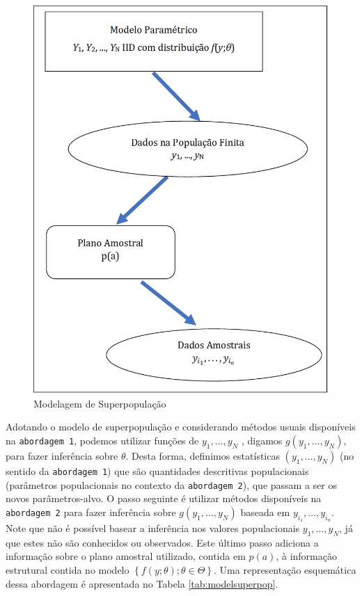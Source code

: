 \documentclass[]{book}
\theoremstyle{definition}
\theoremstyle{definition}
\theoremstyle{definition}
\theoremstyle{remark}
\begin{document}
\begin{figure}
\centering
\includegraphics{Figuras/Figura2.3.png}
\caption{\label{fig:modsup}Modelagem de Superpopulação}
\end{figure}

Adotando o modelo de superpopulação e considerando métodos usuais
disponíveis na \texttt{abordagem\ 1}, podemos utilizar funções de
\(y_{1}, \ldots ,y_{N}\) , digamos \(g( y_{1}, \ldots , y_{N})\), para
fazer inferência sobre \(\theta\). Desta forma, definimos estatísticas
\(\left( y_{1},\ldots ,y_{N}\right)\) (no sentido da
\texttt{abordagem\ 1}) que são quantidades descritivas populacionais
(parâmetros populacionais no contexto da \texttt{abordagem\ 2}), que
passam a ser os novos parâmetros-alvo. O passo seguinte é utilizar
métodos disponíveis na \texttt{abordagem\ 2} para fazer inferência sobre
\(g\left( y_{1}, \ldots , y_{N}\right)\) baseada em
\(y_{i_1},\ldots ,y_{i_n}\). Note que não é possível basear a inferência
nos valores populacionais \(y_{1}, \ldots , y_{N}\), já que estes não
são conhecidos ou observados. Este último passo adiciona a informação
sobre o plano amostral utilizado, contida em \(p(a)\), à informação
estrutural contida no modelo
\(\left\{ f\left( y; \theta \right) ;\theta \in \Theta\right\}\). Uma
representação esquemática dessa abordagem é apresentada no Tabela
\ref{tab:modelsuperpop}.
\end{document}
